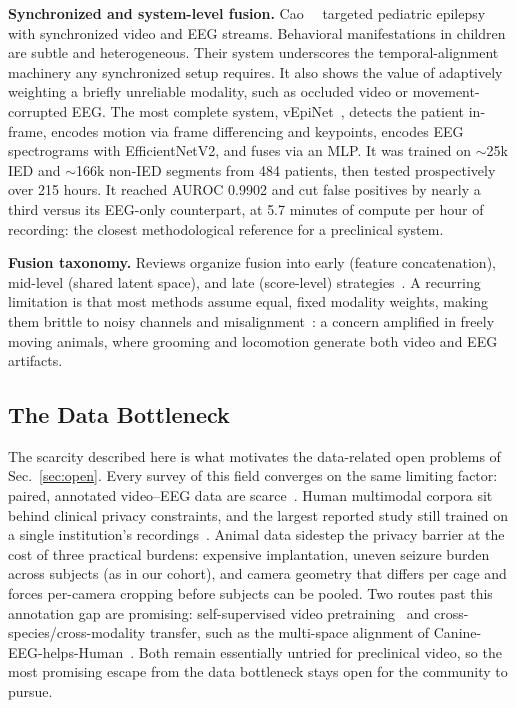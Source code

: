 \noindent\textbf{Synchronized and system-level fusion.}
Cao~\etal~\cite{cao2024} targeted pediatric epilepsy with synchronized video and
EEG streams. Behavioral manifestations in children are subtle and heterogeneous. Their system underscores the temporal-alignment machinery any synchronized setup
requires. It also shows the value of adaptively weighting a briefly unreliable
modality, such as occluded video or movement-corrupted EEG. The most complete
system, vEpiNet~\cite{vepinet2024}, detects the patient in-frame, encodes motion
via frame differencing and keypoints, encodes EEG spectrograms with
EfficientNetV2, and fuses via an MLP. It was trained on $\sim$25k IED and
$\sim$166k non-IED segments from 484 patients, then tested prospectively over 215
hours. It reached AUROC 0.9902 and cut false positives by nearly a third versus
its EEG-only counterpart, at 5.7 minutes of compute per hour of recording: the
closest methodological reference for a preclinical system.

\noindent\textbf{Fusion taxonomy.}
Reviews organize fusion into early (feature concatenation), mid-level (shared
latent space), and late (score-level) strategies~\cite{frontiers_fusion2026,
multimodal_review2026}. A recurring limitation is that most methods assume equal,
fixed modality weights, making them brittle to noisy channels and
misalignment~\cite{frontiers_fusion2026}: a concern amplified in freely moving
animals, where grooming and locomotion generate both video and EEG artifacts.

\subsection{The Data Bottleneck}
\label{sec:bottleneck}

The scarcity described here is what motivates the data-related open problems of
Sec.~\ref{sec:open}. Every survey of this field converges on the same limiting
factor: paired,
annotated video--EEG data are scarce~\cite{mironov2025,multimodal_review2026}.
Human multimodal corpora sit behind clinical privacy constraints, and the
largest reported study still trained on a single institution's
recordings~\cite{vepinet2024}. Animal data sidestep the privacy barrier at the
cost of three practical burdens: expensive implantation, uneven seizure burden
across subjects (as in our cohort), and camera geometry that differs per cage
and forces per-camera cropping before subjects can be pooled. Two routes past
this annotation gap are promising: self-supervised video
pretraining~\cite{tong2022videomae} and cross-species/cross-modality transfer,
such as the multi-space alignment of Canine-EEG-helps-Human~\cite{crossspecies2025}.
Both remain essentially untried for preclinical video, so the most promising
escape from the data bottleneck stays open for the community to pursue.

